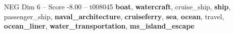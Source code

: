 \begin{textsample}{NEG Dim 6 – Score -8.00 – t008045}  \label{ex:f6_neg_018}
\textbf{boat}, \textbf{watercraft}, cruise\_ship, \textbf{ship}, passenger\_ship, \textbf{naval\_architecture}, \textbf{cruiseferry}, \textbf{sea}, \textbf{ocean}, travel, \textbf{ocean\_liner}, \textbf{water\_transportation}, \textbf{ms\_island\_escape}

\end{textsample}
